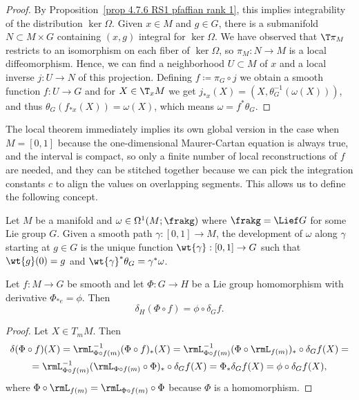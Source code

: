 \begin{proof}
    By Proposition~\ref{prop 4.7.6 RS1 pfaffian rank 1}, this implies integrability of the distribution $\ker\Omega$. Given $x\in M$ and $g\in G$, there is a submanifold $N\subset M\times G$ containing $(x,g)$ integral for $\ker\Omega$. We have observed that $\T\pi_M$ restricts to an isomorphism on each fiber of $\ker \Omega$, so $\pi_M:N\to M$ is a local diffeomorphism. Hence, we can find a neighborhood $U\subset M$ of $x$ and a local inverse $j:U\to N$ of this projection. Defining $f\coloneqq \pi_G\circ j$ we obtain a smooth function $f:U\to G$ and for $X\in \T_xM$ we get $j_{\ast x}(X)=(X,\theta_G^{-1}(\omega(X)))$, and thus $\theta_G(f_{\ast x}(X))=\omega(X)$, which means $\omega=f^\ast\theta_G$.
\end{proof}


The local theorem immediately implies its own global version in the case when $M=[0,1]$ because the one-dimensional Maurer-Cartan equation is always true, and the interval is compact, so only a finite number of local reconstructions of $f$ are needed, and they can be stitched together because we can pick the integration constants $c$ to align the values on overlapping segments. This allows us to define the following concept.

\begin{defn}
    Let $M$ be a manifold and $\omega\in\Omega^1(M;\frakg)$ where $\frakg=\Lief G$ for some Lie group $G$. Given a smooth path $\gamma:[0,1]\to M$, the development of $\omega$ along $\gamma$ starting at $g\in G$ is the unique function $\wt{\gamma}:[0,1]\to G$ such that $\wt{g}(0)=g$ and $\wt{\gamma}^\ast\theta_G=\gamma^\ast\omega$.
\end{defn}

\begin{lem}\label{lem log derivative of homomorphism}
    Let $f:M\to G$ be smooth and let $\Phi:G\to H$ be a Lie group homomorphism with derivative $\Phi_{\ast e}=\phi$. Then 
    \[\delta_H (\Phi\circ f)=\phi\circ\delta_G f.\]
\end{lem}
\begin{proof}
    Let $X\in T_m M$. Then
    \begin{multline}
        \delta(\Phi\circ f)(X)=\rmL_{\Phi\circ f(m)}^{-1}(\Phi\circ f)_\ast(X)=\rmL_{\Phi\circ f(m)}^{-1}(\Phi\circ  \rmL_{f(m)})_\ast\circ  \delta_G f(X)=\\
        =\rmL_{\Phi\circ f(m)}^{-1}(\rmL_{\Phi\circ f(m)}\circ \Phi)_\ast\circ  \delta_G f(X)=\Phi_\ast\delta_G f(X)=\phi\circ \delta_G f(X),
    \end{multline}
    where $\Phi\circ \rmL_{f(m)}=\rmL_{\Phi\circ f(m)}\circ \Phi$ because $\Phi$ is a homomorphism.
\end{proof}

